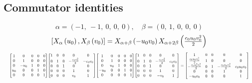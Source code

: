 \documentclass[11pt]{article}
\theoremstyle{definition}
\begin{document}
\def\arraystretch{1}

\subsection{Commutator identities}

\providecommand{\scaletoalign}[2]{%
  \sbox0{$#2$}%
  \ifdim\wd0>#1\relax 
    \resizebox{#1}{!}{\usebox0}%
  \else 
    \usebox0%
  \fi 
}
\[
\alpha = \left( -1, \  -1, \  0, \  0, \  0\right), \quad \beta = \left( 0, \  1, \  0, \  0, \  0\right)
\]
\[
\scaletoalign{\textwidth}{\left[ X_{\alpha}\left(u_{0}\right), X_{\beta}\left(v_{0}\right) \right] = X_{\alpha + \beta}\left(- u_{0} v_{0}\right) X_{\alpha + 2\beta}\left(\frac{c_{0} u_{0} v_{0}^{2}}{2}\right)}
\]
\[
\scaletoalign{\textwidth}{{\left[\begin{matrix}1 & 0 & 0 & 0 & 0\\0 & 1 & 0 & 0 & 0\\0 & - u_{0} & 1 & 0 & 0\\u_{0} & 0 & 0 & 1 & 0\\0 & 0 & 0 & 0 & 1\end{matrix}\right]} {\left[\begin{matrix}1 & 0 & 0 & 0 & 0\\0 & 1 & 0 & - \frac{c_{0} v_{0}^{2}}{2} & - c_{0} v_{0}\\0 & 0 & 1 & 0 & 0\\0 & 0 & 0 & 1 & 0\\0 & 0 & 0 & v_{0} & 1\end{matrix}\right]} {\left[\begin{matrix}1 & 0 & 0 & 0 & 0\\0 & 1 & 0 & 0 & 0\\0 & u_{0} & 1 & 0 & 0\\- u_{0} & 0 & 0 & 1 & 0\\0 & 0 & 0 & 0 & 1\end{matrix}\right]} {\left[\begin{matrix}1 & 0 & 0 & 0 & 0\\0 & 1 & 0 & - \frac{c_{0} v_{0}^{2}}{2} & c_{0} v_{0}\\0 & 0 & 1 & 0 & 0\\0 & 0 & 0 & 1 & 0\\0 & 0 & 0 & - v_{0} & 1\end{matrix}\right]} = {\left[\begin{matrix}1 & 0 & 0 & 0 & 0\\\frac{c_{0} u_{0} v_{0}^{2}}{2} & 1 & 0 & 0 & 0\\- \frac{c_{0} u_{0}^{2} v_{0}^{2}}{2} & 0 & 1 & - \frac{c_{0} u_{0} v_{0}^{2}}{2} & c_{0} u_{0} v_{0}\\0 & 0 & 0 & 1 & 0\\- u_{0} v_{0} & 0 & 0 & 0 & 1\end{matrix}\right]}}
\]
\end{document}
